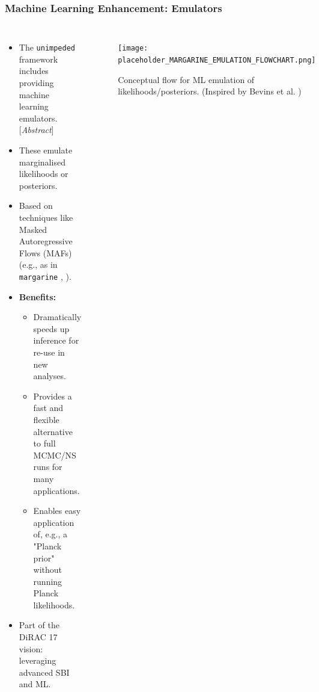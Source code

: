 \documentclass[aspectratio=169]{beamer}
\begin{document}
\begin{frame}
    \frametitle{Machine Learning Enhancement: Emulators}
    \begin{columns}[T]
        \begin{itemize}
            \item The \texttt{unimpeded} framework includes providing machine learning emulators. [\textit{Abstract}]
            \item These emulate marginalised likelihoods or posteriors.
            \item Based on techniques like Masked Autoregressive Flows (MAFs) (e.g., as in \texttt{margarine} , ).
            \item \textbf{Benefits:}
                \begin{itemize}
                    \item Dramatically speeds up inference for re-use in new analyses.
                    \item Provides a fast and flexible alternative to full MCMC/NS runs for many applications.
                    \item Enables easy application of, e.g., a "Planck prior" without running Planck likelihoods.
                \end{itemize}
            \item Part of the DiRAC 17 vision: leveraging advanced SBI and ML.
        \end{itemize}
        \begin{figure}
            \centering
            \texttt{[image: placeholder\_MARGARINE\_EMULATION\_FLOWCHART.png]}
            \caption{Conceptual flow for ML emulation of likelihoods/posteriors. (Inspired by Bevins et al. ) }
        \end{figure}
    \end{columns}
\end{frame}
\end{document}
